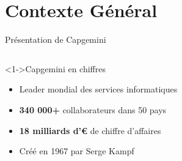 \documentclass[aspectratio=169]{beamer}
\begin{document}
\section{Contexte Général}

\begin{frame}{Présentation de Capgemini}
    \begin{columns}
        \begin{block}<1->{Capgemini en chiffres}
            \begin{itemize}
                \item<2-> Leader mondial des services informatiques
                \item<3-> \textbf{340 000+} collaborateurs dans 50 pays
                \item<4-> \textbf{18 milliards d'€} de chiffre d'affaires
                \item<5-> Créé en 1967 par Serge Kampf
            \end{itemize}
        \end{block}

        \begin{center}
        \end{center}
    \end{columns}

\end{frame}
\end{document}

